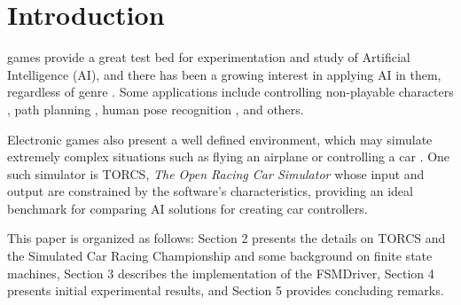 \section{Introduction}
 games provide a great test bed for experimentation and 
study of Artificial Intelligence (AI), and there has been a growing interest in 
applying AI in them, regardless of genre \cite{simon2008}. Some applications 
include controlling non-playable characters \cite{stanley2005}, path planning \cite{freitas2012}, human pose recognition \cite{shotton2011}, and others. 

Electronic games also present a well defined environment, which may simulate 
extremely complex situations such as flying an airplane or controlling a car 
\cite{scr2009}. One such simulator is TORCS, \emph{The Open Racing Car Simulator}
\cite{TORCS} whose input and output are constrained by the software's characteristics, providing an ideal benchmark for comparing AI solutions for creating car controllers.

 This paper is organized as follows: Section 2 presents the details on TORCS and 
 the Simulated Car Racing Championship and some background on finite state machines,
 Section 3 describes the implementation of the FSMDriver, Section 4 presents 
 initial experimental results, and Section 5 provides concluding remarks.
